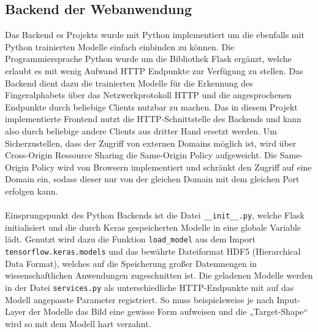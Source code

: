 \documentclass[11pt,bibliography=totocnumbered]{scrartcl}
\begin{document}
\subsection{Backend der Webanwendung}
Das Backend es Projekts wurde mit Python implementiert um die ebenfalls mit Python trainierten Modelle einfach einbinden zu können. Die Programmiersprache Python wurde um die Bibliothek Flask ergänzt, welche erlaubt es mit wenig Aufwand HTTP Endpunkte zur Verfügung zu stellen. Das Backend dient dazu die trainierten Modelle für die Erkennung des Fingeralphabets über das Netzwerkprotokoll HTTP und die angesprochenen Endpunkte durch beliebige Clients nutzbar zu machen. Das in diesem Projekt implementierte Frontend nutzt die HTTP-Schnittstelle des Backends und kann also durch beliebige andere Clients aus dritter Hand ersetzt werden. Um Sicherzustellen, dass der Zugriff von externen Domains möglich ist, wird über Cross-Origin Ressource Sharing die Same-Origin Policy aufgeweicht. Die Same-Origin Policy wird von Browsern implementiert und schränkt den Zugriff auf eine Domain ein, sodass dieser nur von der gleichen Domain mit dem gleichen Port erfolgen kann.
\\\\
Einsprungspunkt des Python Backends ist die Datei \lstinline[language=pythoninline]|__init__.py|, welche Flask initialisiert und die durch Keras gespeicherten Modelle in eine globale Variable lädt. Genutzt wird dazu die Funktion \lstinline[language=pythoninline]|load_model| aus dem Import \lstinline[language=pythoninline]|tensorflow.keras.models| und das bewährte Dateiformat HDF5 (Hierarchical Data Format), welches auf die Speicherung großer Datenmengen in wissenschaftlichen Anwendungen zugeschnitten ist. Die geladenen Modelle werden in der Datei \lstinline[language=pythoninline]|services.py| als unterschiedliche HTTP-Endpunkte mit auf das Modell angepasste Parameter registriert. So muss beispielsweise je nach Input-Layer der Modelle das Bild eine gewisse Form aufweisen und die „Target-Shape“ wird so mit dem Modell hart verzahnt. 
\end{document}
